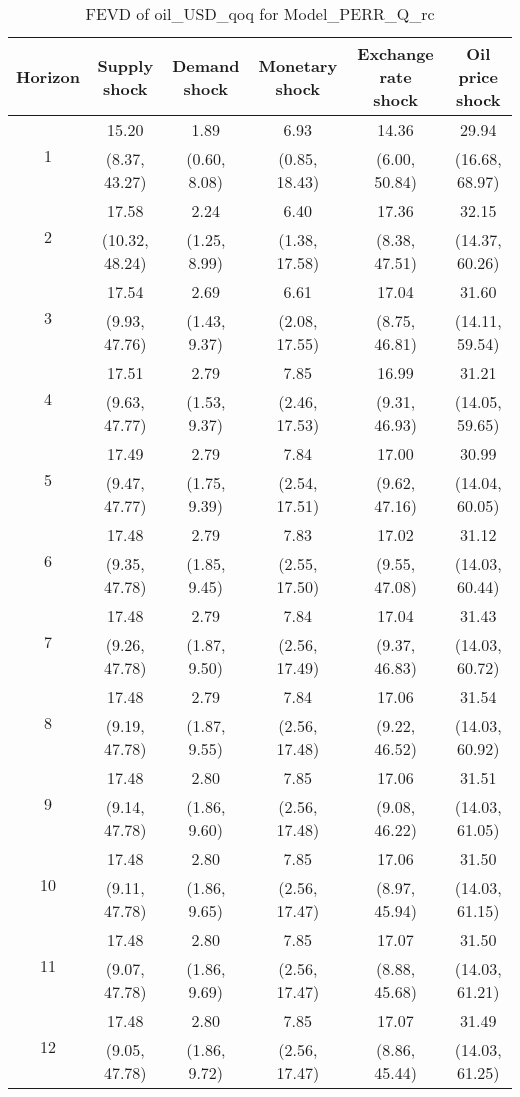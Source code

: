 \documentclass{article}
\begin{document}
\begin{table}
	\footnotesize
	\caption{FEVD of oil_USD_qoq for Model_PERR_Q_rc}
	\begin{tabular}{cccccc}
		Horizon & Supply shock & Demand shock & Monetary shock & Exchange rate shock & Oil price shock\\ \hline
		\multirow{2}{*}{1} & 15.20 & 1.89 & 6.93 & 14.36 & 29.94\\
		 & (8.37, 43.27) & (0.60, 8.08) & (0.85, 18.43) & (6.00, 50.84) & (16.68, 68.97)\\
		\multirow{2}{*}{2} & 17.58 & 2.24 & 6.40 & 17.36 & 32.15\\
		 & (10.32, 48.24) & (1.25, 8.99) & (1.38, 17.58) & (8.38, 47.51) & (14.37, 60.26)\\
		\multirow{2}{*}{3} & 17.54 & 2.69 & 6.61 & 17.04 & 31.60\\
		 & (9.93, 47.76) & (1.43, 9.37) & (2.08, 17.55) & (8.75, 46.81) & (14.11, 59.54)\\
		\multirow{2}{*}{4} & 17.51 & 2.79 & 7.85 & 16.99 & 31.21\\
		 & (9.63, 47.77) & (1.53, 9.37) & (2.46, 17.53) & (9.31, 46.93) & (14.05, 59.65)\\
		\multirow{2}{*}{5} & 17.49 & 2.79 & 7.84 & 17.00 & 30.99\\
		 & (9.47, 47.77) & (1.75, 9.39) & (2.54, 17.51) & (9.62, 47.16) & (14.04, 60.05)\\
		\multirow{2}{*}{6} & 17.48 & 2.79 & 7.83 & 17.02 & 31.12\\
		 & (9.35, 47.78) & (1.85, 9.45) & (2.55, 17.50) & (9.55, 47.08) & (14.03, 60.44)\\
		\multirow{2}{*}{7} & 17.48 & 2.79 & 7.84 & 17.04 & 31.43\\
		 & (9.26, 47.78) & (1.87, 9.50) & (2.56, 17.49) & (9.37, 46.83) & (14.03, 60.72)\\
		\multirow{2}{*}{8} & 17.48 & 2.79 & 7.84 & 17.06 & 31.54\\
		 & (9.19, 47.78) & (1.87, 9.55) & (2.56, 17.48) & (9.22, 46.52) & (14.03, 60.92)\\
		\multirow{2}{*}{9} & 17.48 & 2.80 & 7.85 & 17.06 & 31.51\\
		 & (9.14, 47.78) & (1.86, 9.60) & (2.56, 17.48) & (9.08, 46.22) & (14.03, 61.05)\\
		\multirow{2}{*}{10} & 17.48 & 2.80 & 7.85 & 17.06 & 31.50\\
		 & (9.11, 47.78) & (1.86, 9.65) & (2.56, 17.47) & (8.97, 45.94) & (14.03, 61.15)\\
		\multirow{2}{*}{11} & 17.48 & 2.80 & 7.85 & 17.07 & 31.50\\
		 & (9.07, 47.78) & (1.86, 9.69) & (2.56, 17.47) & (8.88, 45.68) & (14.03, 61.21)\\
		\multirow{2}{*}{12} & 17.48 & 2.80 & 7.85 & 17.07 & 31.49\\
		 & (9.05, 47.78) & (1.86, 9.72) & (2.56, 17.47) & (8.86, 45.44) & (14.03, 61.25)\\
	\end{tabular}
\label{tab:fevd-Model_PERR_Q_rc-oil_USD_qoq}
\end{table}
\end{document}
